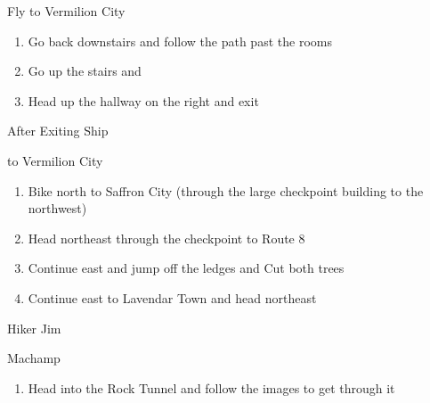 \begin{paracol}{2}
\switchcolumn
\vspace{3.5cm}
\begin{story}{Fly to Vermilion City}
	\varwb
	\varwe
\end{story}

\switchcolumn
\begin{enumerate}[resume]
	\item Go back downstairs and follow the path past the rooms
	\item Go up the stairs and 
	\item Head up the hallway on the right and exit 
\end{enumerate}

\begin{menu}{After Exiting Ship}
	\varwb
	\begin{packMenu}
		\item \superRepel
	\end{packMenu}
	\begin{pokeMenu}
		\item {} \fly{} to Vermilion City \menuHlTwo{(\pointUp)}
	\end{pokeMenu}
	\varwe
\end{menu}

\begin{enumerate}[resume]
	\item Bike north to Saffron City (through the large checkpoint building to the northwest)
	\item Head northeast through the checkpoint to Route 8
	\item Continue east and jump off the ledges and Cut both trees
	\item Continue east to Lavendar Town and head northeast
\end{enumerate} 

\begin{trainer}{Hiker Jim}
	\varwb
	\begin{fightSection}{Machamp}
		\item {} \return
	\end{fightSection}
	\varwe
\end{trainer}

\begin{enumerate}[resume]
	\item Head into the Rock Tunnel and follow the images to get through it
\end{enumerate} 


\end{paracol}
